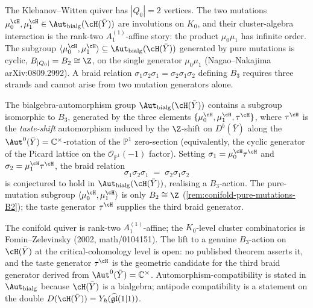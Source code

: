 \begin{remark}
 \label{rem:conifold-pure-mutations-B2}
 The Klebanov--Witten quiver has $|Q_0| = 2$ vertices. The two
 mutations $\mu_0^\cH, \mu_1^\cH \in \Aut_{\mathrm{bialg}}(\cH(\bar Y))$
 are involutions on $K_0$, and their cluster-algebra interaction is
 the rank-two $A_1^{(1)}$-affine story: the product $\mu_0 \mu_1$ has
 infinite order. The subgroup
 $\langle \mu_0^\cH, \mu_1^\cH \rangle \subseteq \Aut_{\mathrm{bialg}}(\cH(\bar Y))$
 generated by pure mutations is cyclic,
 $B_{|Q_0|} = B_2 \cong \Z$, on the single generator $\mu_0 \mu_1$
 (Nagao--Nakajima arXiv:0809.2992). A braid relation
 $\sigma_1 \sigma_2 \sigma_1 = \sigma_2 \sigma_1 \sigma_2$ defining
 $B_3$ requires three strands and cannot arise from two mutation
 generators alone.
\end{remark}

\begin{conjecture}
 \label{conj:braid-b3-conifold}
\ClaimStatusConjectured
 The bialgebra-automorphism group $\Aut_{\mathrm{bialg}}(\cH(\bar{Y}))$
 contains a subgroup isomorphic to $B_3$, generated by the three
 elements $\{\mu_0^\cH, \mu_1^\cH, \tau^\cH\}$, where $\tau^\cH$ is
 the \emph{taste-shift} automorphism induced by the
 $\Z$-shift on $D^b(\bar Y)$ along the
 $\Aut^0(\bar Y) = \mathbb{C}^\times$-rotation of the $\mathbb{P}^1$
 zero-section (equivalently, the cyclic generator of the Picard
 lattice on the $\mathcal{O}_{\mathbb{P}^1}(-1)$ factor). Setting
 $\sigma_1 = \mu_0^\cH \tau^\cH$ and $\sigma_2 = \mu_1^\cH \tau^\cH$,
 the braid relation
 \[
 \sigma_1 \sigma_2 \sigma_1 \;=\; \sigma_2 \sigma_1 \sigma_2
 \]
 is conjectured to hold in $\Aut_{\mathrm{bialg}}(\cH(\bar Y))$,
 realising a $B_3$-action. The pure-mutation subgroup
 $\langle \mu_0^\cH, \mu_1^\cH\rangle$ is only $B_2 \cong \Z$
 (\cref{rem:conifold-pure-mutations-B2}); the taste generator
 $\tau^\cH$ supplies the third braid generator.
\end{conjecture}

\begin{remark}
 \label{rem:B3-conifold-primary-source}
 The conifold quiver is rank-two $A_1^{(1)}$-affine; the $K_0$-level
 cluster combinatorics is Fomin--Zelevinsky (2002, math/0104151). The
 lift to a genuine $B_3$-action on $\cH(\bar Y)$ at the
 critical-cohomology level is open: no published theorem asserts it,
 and the taste generator $\tau^\cH$ is the geometric candidate for the
 third braid generator derived from $\Aut^0(\bar Y) = \mathbb{C}^\times$.
 Automorphism-compatibility is stated in $\Aut_{\mathrm{bialg}}$
 because $\cH(\bar Y)$ is a bialgebra; antipode compatibility is a
 statement on the double
 $D(\cH(\bar Y)) = Y_\hbar(\widehat{\mathfrak{gl}}(1|1))$.
\end{remark}

